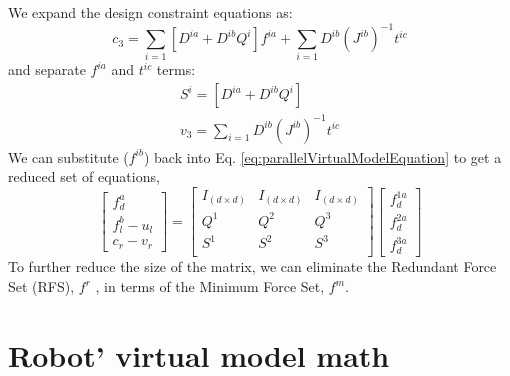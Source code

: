 \documentclass[]{article}
\begin{document}
We expand the design constraint equations as:
\begin{equation}
c_3=\sum_{i=1}[D^{ia}+D^{ib}Q^i]f^{ia}+\sum_{i=1}D^{ib}(J^{ib})^{-1}t^{ic}
\label{eq:c3}
\end{equation}
and separate $f^{ia}$ and $t^{ic}$ terms: 
\begin{eqnarray}
\label{eq:Si}
S^i=[D^{ia}+D^{ib}Q^i]	\\
\label{eq:v3S}
v_3=\sum_{i=1}D^{ib}(J^{ib})^{-1}t^{ic}	
\end{eqnarray}
We can substitute ($f^{ib}$) back into Eq. \ref{eq:parallelVirtualModelEquation} to get a reduced set of equations,
\begin{equation}
\begin{bmatrix}
f_d^a			\\
f_l^{b}-u_l	\\
c_r-v_r
\end{bmatrix}
=
\begin{bmatrix}
I_{(d\times d)}	&I_{(d\times d)}	&I_{(d\times d)}	\\ 
Q^1				&Q^2			&Q^3			\\
S^1				&S^2			&S^3			\\
\end{bmatrix}
\begin{bmatrix}
f_d^{1a} 	\\
f_d^{2a}	\\
f_d^{3a} 	
\end{bmatrix}
\label{eq:parallelVirtualModelEquationReduced}
\end{equation}
To further reduce the size of the matrix, we can eliminate the
Redundant Force Set (RFS), $f^r$ , in terms of the Minimum Force Set, $f^m$.
\section{Robot' virtual model math}
\end{document}
